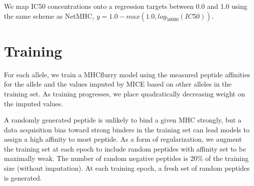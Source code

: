 We map IC50 concentrations onto a regression targets between 0.0 and 1.0 using the same scheme as NetMHC, $y = 1.0 - max(1.0, log_{50000}(IC50))$.

\section{Training}

For each allele, we train a MHCflurry model using the measured peptide affinities for the allele and the values imputed by MICE based on other alleles in the training set. As training progresses, we place quadratically decreasing weight on the imputed values.

A randomly generated peptide is unlikely to bind a given MHC strongly, but a data acquisition bias toward strong binders in the training set can lead models to assign a high affinity to most peptide. As a form of regularization, we augment the training set at each epoch to include random peptides with affinity set to be maximally weak. The number of random negative peptides is 20\% of the training size (without imputation). At each training epoch, a fresh set of random peptides is generated.
